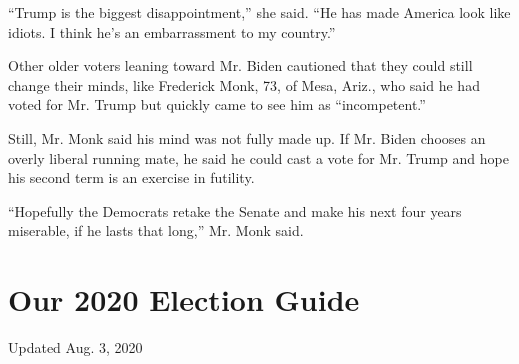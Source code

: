 ``Trump is the biggest disappointment,'' she said. ``He has made America
look like idiots. I think he's an embarrassment to my country.''

Other older voters leaning toward Mr. Biden cautioned that they could
still change their minds, like Frederick Monk, 73, of Mesa, Ariz., who
said he had voted for Mr. Trump but quickly came to see him as
``incompetent.''

Still, Mr. Monk said his mind was not fully made up. If Mr. Biden
chooses an overly liberal running mate, he said he could cast a vote for
Mr. Trump and hope his second term is an exercise in futility.

``Hopefully the Democrats retake the Senate and make his next four years
miserable, if he lasts that long,'' Mr. Monk said.

\hypertarget{our-2020-election-guide}{%
\section{Our 2020 Election Guide}\label{our-2020-election-guide}}

Updated Aug. 3, 2020

